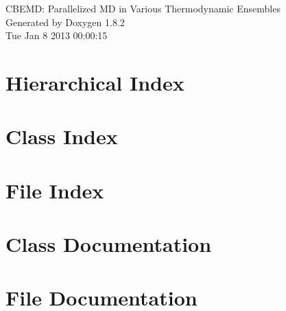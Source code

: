 \documentclass{book}
\begin{document}
\hypersetup{pageanchor=false,citecolor=blue}
\begin{titlepage}
\vspace*{7cm}
\begin{center}
{\Large C\-B\-E\-M\-D\-: Parallelized M\-D in Various Thermodynamic Ensembles }\\
\vspace*{1cm}
{\large Generated by Doxygen 1.8.2}\\
\vspace*{0.5cm}
{\small Tue Jan 8 2013 00:00:15}\\
\end{center}
\end{titlepage}
\clearemptydoublepage
{}
\tableofcontents
\clearemptydoublepage
{}
\hypersetup{pageanchor=true,citecolor=blue}
\chapter{Hierarchical Index}

\chapter{Class Index}

\chapter{File Index}

\chapter{Class Documentation}








\chapter{File Documentation}

























\printindex
\end{document}
